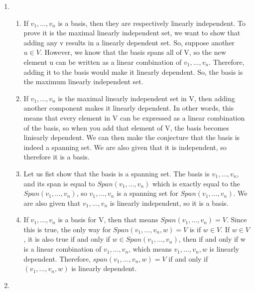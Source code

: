 \documentclass{article}
\begin{document}
\begin{enumerate}
\begin{enumerate}
\begin{enumerate}
\end{enumerate}

\end{enumerate}

\item

\begin{enumerate}

\item If $v_1,...,v_n$ is a basis, then they are respectively linearly independent. To prove it is the maximal linearly independent set, we want to show that adding any v results in a linearly dependent set. So, suppose another $u \in V$. However, we know that the basis spans all of V, so the new element u can be written as a linear combination of $v_1,...,v_n$. Therefore, adding it to the basis would make it linearly dependent. So, the basis is the maximum linearly independent set.

\item If $v_1,...,v_n$ is the maximal linearly independent set in V, then adding another component makes it linearly dependent. In other words, this means that every element in V can be expressed as a linear combination of the basis, so when you add that element of V, the basis becomes liniearly dependent. We can then make the conjecture that the basis is indeed a spanning set. We are also given that it is independent, so therefore it is a basis.

\item Let us fist show that the basis is a spanning set. The basis is $v_1,...,v_n$, and its span is equal to $Span(v_1,...,v_n)$ which is exactly equal to the $Span(v_1,...,v_n)$, so $v_1,...,v_n$ is a spanning set for $Span(v_1,...,v_n)$. We are also given that $v_1,...,v_n$ is linearly independent, so it is a basis.

\item If $v_1,...,v_n$ is a basis for V, then that means $Span(v_1,...,v_n) = V$. Since this is true, the only way for $Span(v_1,...,v_n,w) = V$ is if $w \in V$. If $w \in V$, it is also true if and only if $w \in Span(v_1,...,v_n)$, then if and only if w is a linear combination of $v_1,...,v_n$, which means $v_1,...,v_n,w$ is linearly dependent. Therefore, $span(v_1,...,v_n,w) = V$ if and only if $(v_1,...,v_n,w)$ is linearly dependent.

\end{enumerate}

\item

\begin{enumerate}


\end{enumerate}
\end{enumerate}
\end{document}
